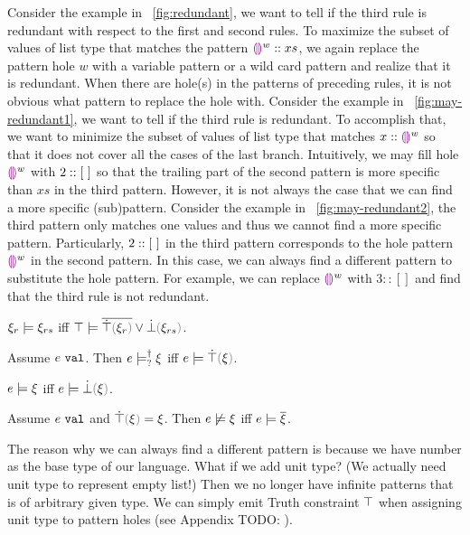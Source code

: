 \documentclass[runningheads,envcountsame,a4paper]{llncs}
\newcommand{\todo}[1]{{\color{red} TODO: #1}}
\begin{document}
Consider the example in \figurename~\ref{fig:redundant}, we want to tell if the third rule is redundant with respect to the first and second rules. To maximize the subset of values of list type that matches the pattern $\textcolor{violet}{\llparenthesis}\textcolor{violet}{\rrparenthesis}^{w}::xs$, we again replace the pattern hole $w$ with a variable pattern or a wild card pattern and realize that it is redundant. When there are hole(s) in the patterns of preceding rules, it is not obvious what pattern to replace the hole with. Consider the example in \figurename~\ref{fig:may-redundant1}, we want to tell if the third rule is redundant. To accomplish that, we want to minimize the subset of values of list type that matches $x::\textcolor{violet}{\llparenthesis}\textcolor{violet}{\rrparenthesis}^{w}$ so that it does not cover all the cases of the last branch. Intuitively, we may fill hole $\textcolor{violet}{\llparenthesis}\textcolor{violet}{\rrparenthesis}^{w}$ with $2::[~]$ so that the trailing part of the second pattern is more specific than $xs$ in the third pattern. However, it is not always the case that we can find a more specific (sub)pattern. Consider the example in \figurename~\ref{fig:may-redundant2}, the third pattern only matches one values and thus we cannot find a more specific pattern. Particularly, $2::[~]$ in the third pattern corresponds to the hole pattern $\textcolor{violet}{\llparenthesis}\textcolor{violet}{\rrparenthesis}^{w}$ in the second pattern. In this case, we can always find a different pattern to substitute the hole pattern. For example, we can replace $\textcolor{violet}{\llparenthesis}\textcolor{violet}{\rrparenthesis}^{w}$ with $3::[]$ and find that the third rule is not redundant.
\begin{theorem}
  $\xi_r \models \xi_{rs}$ iff $\csatisfy{\ctruth}{\cor{\cdual{\ctruify{\xi_r}}}{\cfalsify{\xi_{rs}}}}$.
\end{theorem}

\begin{lemma}
  Assume $e ~\mathtt{val}$. Then $e \models_{?}^{\dag} \xi$ iff $\csatisfy{e}{\ctruify{\xi}}$.
\end{lemma}

\begin{lemma}
  $e \models \xi$ iff $\csatisfy{e}{\cfalsify{\xi}}$.
\end{lemma}

\begin{lemma}
  Assume $e ~\mathtt{val}$ and $\ctruify{\xi}=\xi$. Then $e \not\models \xi$ iff $e \models \overline{\xi}$.
\end{lemma}

The reason why we can always find a different pattern is because we have number as the base type of our language. What if we add unit type? (We actually need unit type to represent empty list!) Then we no longer have infinite patterns that is of arbitrary given type. We can simply emit Truth constraint $\top$ when assigning unit type to pattern holes (see Appendix \todo{}).
\end{document}
